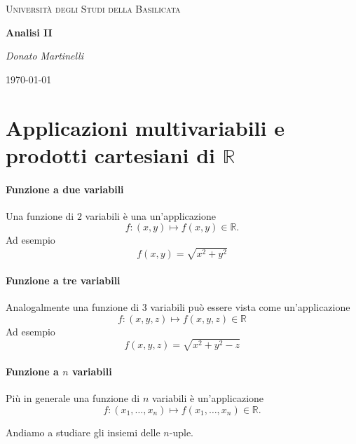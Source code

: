 \documentclass{article}
\theoremstyle{plain}
\theoremstyle{definition}
\theoremstyle{remark}
\begin{document}
\begin{titlepage}
    \centering
	{\textsc{Università degli Studi della Basilicata} \par}
	\vspace{2cm}
    {\huge\bfseries Analisi II\par}
    \vfill
	{\Large\itshape Donato Martinelli\par}
	{\large \today\par}
\end{titlepage}
\tableofcontents

\newpage 

\section{Applicazioni multivariabili e prodotti cartesiani di $\mathbb{R}$}

\vspace{10pt}

\paragraph{Funzione a due variabili}
Una funzione di $2$ variabili è una un'applicazione \[f:(x,y)\mapsto f(x,y)\in\mathbb{R}.\]
Ad esempio
\[f(x,y)=\sqrt{x^2+y^2}\]

\vspace{10pt}

\paragraph{Funzione a tre variabili}
Analogalmente una funzione di 3 variabili può essere vista come un'applicazione 
\[f:(x,y,z)\mapsto f(x,y,z)\in\mathbb{R}\]
Ad esempio
\[f(x,y,z)=\sqrt{x^2+y^2-z}\]

\vspace{10pt}

\paragraph{Funzione a $n$ variabili}
Più in generale una funzione di $n$ variabili è un'applicazione 
\[f:(x_1,\ldots,x_n)\mapsto f(x_1,\ldots,x_n)\in\mathbb{R}.\]

\vspace{10pt}

Andiamo a studiare gli insiemi delle $n$-uple.

\vspace{10pt}
\end{document}
